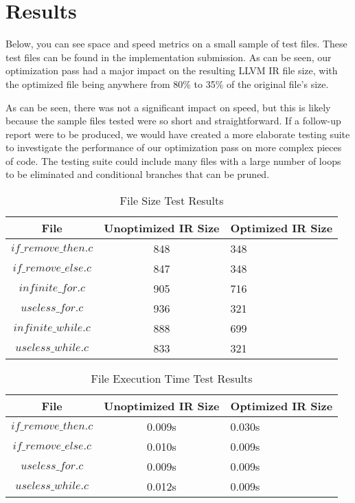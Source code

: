 \documentclass[sigconf]{acmart}
\begin{document}
\section{Results}
Below, you can see space and speed metrics on a small sample of test files. These test files can 
be found in the implementation submission.
As can be seen, our optimization pass had a major impact on the resulting LLVM IR file size, with the 
optimized file being anywhere from 80\% to 35\% of the original file's size. 

As can be seen, there was not a significant impact on speed, but this is likely because the sample files tested were so 
short and straightforward. If a follow-up report were to be produced, we would have created a more 
elaborate testing suite to investigate the performance of our optimization pass on more complex 
pieces of code. The testing suite could include many files with a large number of loops to be 
eliminated and conditional branches that can be pruned.



\begin{table*}
  \caption{File Size Test Results}
  \begin{tabular}{ccl}
    \toprule
    File & Unoptimized IR Size & Optimized IR Size \\
    \midrule
    \texttt{$if\_remove\_then.c$}& 848& 348 \\
    \texttt{$if\_remove\_else.c$}&  847& 348\\
    \texttt{$infinite\_for.c$}& 905& 716 \\
    \texttt{$useless\_for.c$}& 936& 321  \\
    \texttt{$infinite\_while.c$}& 888 & 699 \\
    \texttt{$useless\_while.c$}& 833 & 321  \\
    \bottomrule
  \end{tabular}
\end{table*}

\begin{table*}
  \caption{File Execution Time Test Results}
  \label{tab:commands}
  \begin{tabular}{ccl}
    \toprule
    File & Unoptimized IR Size & Optimized IR Size \\
    \midrule
    \texttt{$if\_remove\_then.c$}& 0.009s & 0.030s \\
    \texttt{$if\_remove\_else.c$}&  0.010s & 0.009s \\
    \texttt{$useless\_for.c$}& 0.009s & 0.009s  \\
    \texttt{$useless\_while.c$}& 0.012s &  0.009s \\
    \bottomrule
  \end{tabular}
\end{table*}
\end{document}
